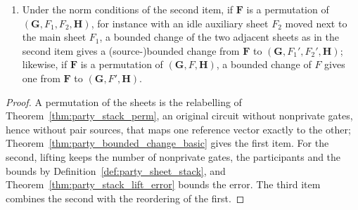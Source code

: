 \begin{theorem}
\begin{enumerate}
              into $F_1',F_2'$ from $r_{F_1}\otimes r_{F_2}$ to $r_{F_1'}\otimes r_{F_2'}$.
        \item Under the norm conditions of the second item, if $\mathbf F$ is a permutation of
              $(\mathbf G,F_1,F_2,\mathbf H)$, for instance with an idle auxiliary sheet $F_2$ moved
              next to the main sheet $F_1$, a bounded change of the two adjacent sheets as in the
              second item gives a (source-)bounded change from $\mathbf F$ to
              $(\mathbf G,F_1',F_2',\mathbf H)$; likewise, if $\mathbf F$ is a permutation of
              $(\mathbf G,F,\mathbf H)$, a bounded change of $F$ gives one from $\mathbf F$ to
              $(\mathbf G,F',\mathbf H)$.
    \end{enumerate}
\end{theorem}
\begin{proof}\leanok
    A permutation of the sheets is the relabelling of Theorem~\ref{thm:party_stack_perm}, an
    original circuit without nonprivate gates, hence without pair sources, that maps one
    reference vector exactly to the other; Theorem~\ref{thm:party_bounded_change_basic} gives
    the first item. For the second, lifting keeps the number of nonprivate gates, the
    participants and the bounds by Definition~\ref{def:party_sheet_stack}, and
    Theorem~\ref{thm:party_stack_lift_error} bounds the error. The third item combines the second
    with the reordering of the first.
\end{proof}

